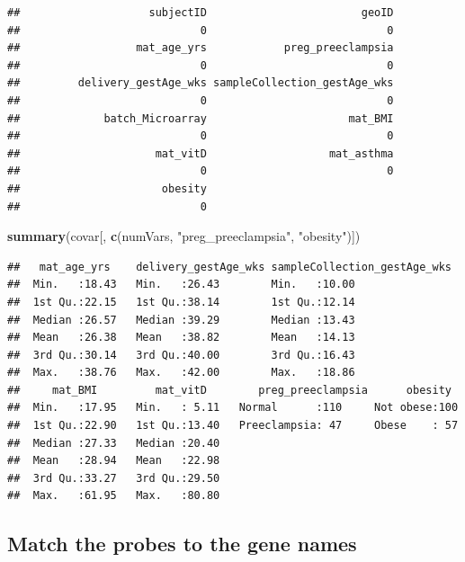 \documentclass[
]{article}
\newenvironment{Shaded}{\begin{snugshade}}{\end{snugshade}}
\newcommand{\FunctionTok}[1]{\textcolor[rgb]{0.13,0.29,0.53}{\textbf{#1}}}
\newcommand{\NormalTok}[1]{#1}
\newcommand{\StringTok}[1]{\textcolor[rgb]{0.31,0.60,0.02}{#1}}
\begin{document}
\begin{verbatim}
##                    subjectID                        geoID 
##                            0                            0 
##                  mat_age_yrs            preg_preeclampsia 
##                            0                            0 
##         delivery_gestAge_wks sampleCollection_gestAge_wks 
##                            0                            0 
##             batch_Microarray                      mat_BMI 
##                            0                            0 
##                     mat_vitD                   mat_asthma 
##                            0                            0 
##                      obesity 
##                            0
\end{verbatim}

\begin{Shaded}
\begin{Highlighting}[]
\FunctionTok{summary}\NormalTok{(covar[, }\FunctionTok{c}\NormalTok{(numVars, }\StringTok{"preg\_preeclampsia"}\NormalTok{, }\StringTok{"obesity"}\NormalTok{)])}
\end{Highlighting}
\end{Shaded}

\begin{verbatim}
##   mat_age_yrs    delivery_gestAge_wks sampleCollection_gestAge_wks
##  Min.   :18.43   Min.   :26.43        Min.   :10.00               
##  1st Qu.:22.15   1st Qu.:38.14        1st Qu.:12.14               
##  Median :26.57   Median :39.29        Median :13.43               
##  Mean   :26.38   Mean   :38.82        Mean   :14.13               
##  3rd Qu.:30.14   3rd Qu.:40.00        3rd Qu.:16.43               
##  Max.   :38.76   Max.   :42.00        Max.   :18.86               
##     mat_BMI         mat_vitD        preg_preeclampsia      obesity   
##  Min.   :17.95   Min.   : 5.11   Normal      :110     Not obese:100  
##  1st Qu.:22.90   1st Qu.:13.40   Preeclampsia: 47     Obese    : 57  
##  Median :27.33   Median :20.40                                       
##  Mean   :28.94   Mean   :22.98                                       
##  3rd Qu.:33.27   3rd Qu.:29.50                                       
##  Max.   :61.95   Max.   :80.80
\end{verbatim}

\subsection{Match the probes to the gene
names}\label{match-the-probes-to-the-gene-names}
\end{document}
